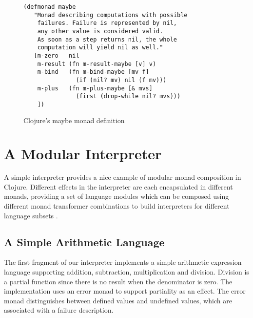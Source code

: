 \documentclass[natbib,10pt]{sigplanconf}
\begin{document}
\begin{figure}
\begin{center}
\begin{verbatim}
(defmonad maybe
   "Monad describing computations with possible
    failures. Failure is represented by nil,
    any other value is considered valid.
    As soon as a step returns nil, the whole
    computation will yield nil as well."
   [m-zero   nil
    m-result (fn m-result-maybe [v] v)
    m-bind   (fn m-bind-maybe [mv f]
               (if (nil? mv) nil (f mv)))
    m-plus   (fn m-plus-maybe [& mvs]
               (first (drop-while nil? mvs)))
    ])

\end{verbatim}
\end{center}
\caption{Clojure's maybe monad definition}
\label{fig-Clojure-maybe-defn}
\end{figure}

\section{A Modular Interpreter}

A simple interpreter provides a nice example of modular monad
composition in Clojure.  Different effects in the interpreter are each
encapsulated in different monads, providing a set of language modules
which can be composed using different monad transformer combinations
to build interpreters for different language subsets
\citep{modular-interpreters, semantic-lego}.

\subsection {A Simple Arithmetic Language}

The first fragment of our interpreter implements a simple
arithmetic expression language supporting addition, subtraction,
multiplication and division. Division is a partial function
since there is no result when the denominator is zero.  The
implementation uses an error monad to support partiality as an effect.
The error monad distinguishes between defined values and undefined values,
which are associated with a failure description.
\end{document}
